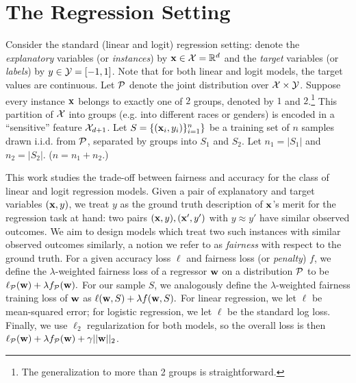 \section{The Regression Setting}
Consider the standard (linear and logit) regression setting: denote
the \emph{explanatory} variables (or \emph{instances}) by
$\mathbf{x} \in \mathcal{X} = \mathbb{R}^d$ and the \emph{target} variables (or
\emph{labels}) by $y \in \mathcal{Y} = [-1,1]$.  Note that for both linear and
logit models, the target values are continuous. Let $\mathcal{P}$ denote the
joint distribution over $\mathcal{X} \times \mathcal{Y}$. Suppose every instance $\mathbf{x}$
belongs to exactly one of $2$ groups, denoted by $1$ and
$2$.\footnote{The generalization to more than 2 groups is
  straightforward.} This partition of $\mathcal{X}$ into groups (e.g. into
different races or genders) is encoded in a ``sensitive'' feature
$\mathcal{X}_{d+1}$. Let $S = \{({\bf x}_{i}, y_{i})\}_{i=1}^n\}$ be a training set of
$n$ samples drawn i.i.d. from $\mathcal{P}$, separated by groups into $S_1$
and $S_2$. Let $n_1 = |S_1|$ and $n_2=|S_2|$.  ($n = n_1+n_2$.)


This work studies the trade-off between fairness and accuracy for the
class of linear and logit regression models.  Given a pair of
explanatory and target variables $(\mathbf{x}, y)$, we treat $y$ as the
ground truth description of $\mathbf{x}$'s merit for the regression task at
hand: two pairs $(\mathbf{x}, y), (\mathbf{x}', y')$ with $y\approx y'$ have similar
observed outcomes. We aim to design models which treat two such
instances with similar observed outcomes similarly, a notion we refer
to as \emph{ fairness} with respect to the ground truth. For a given
accuracy loss $\ell$ and fairness loss (or \emph{penalty}) $f$, we
define the $\lambda$-weighted fairness loss of a regressor $\mathbf{w}$ on a
distribution $\mathcal{P}$ to be $\ell_{\mathcal{P}}(\mathbf{w}) + \lambda f_{\mathcal{P}} (\mathbf{w}).$ For
our sample $S$, we analogously define the $\lambda$-weighted fairness
training loss of $\mathbf{w}$ as $\ell(\mathbf{w}, S) + \lambda f(\mathbf{w}, S).$ For
linear regression, we let $\ell$ be mean-squared error; for logistic
regression, we let $\ell$
be the standard log loss. Finally, we use $\ell_2$ regularization for
both models, so the overall loss is then
$ \ell_{\mathcal{P}}(\mathbf{w}) + \lambda f_{\mathcal{P}}(\mathbf{w}) + \gamma ||\mathbf{w}||_2 $.

%
%

%
